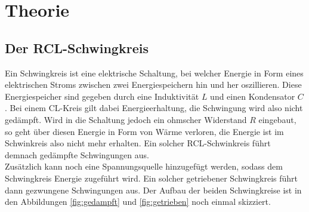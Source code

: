 \section{Theorie}
\label{sec:Theorie}
\subsection{Der RCL-Schwingkreis}
\label{sec:RCL}
Ein Schwingkreis ist eine elektrische Schaltung, bei welcher Energie in Form eines elektrischen Stroms zwischen zwei Energiespeichern hin 
und her oszillieren. Diese Energiespeicher sind gegeben durch eine Induktivität $L$ und einen Kondensator $C$. Bei einem CL-Kreis gilt dabei
Energieerhaltung, die Schwingung wird also nicht gedämpft. Wird in die Schaltung jedoch ein ohmscher Widerstand $R$ eingebaut, so geht über 
diesen Energie in Form von Wärme verloren, die Energie ist im Schwinkreis also nicht mehr erhalten. Ein solcher RCL-Schwinkreis führt demnach
gedämpfte Schwingungen aus.\\\noindent
Zusätzlich kann noch eine Spannungsquelle hinzugefügt werden, sodass dem Schwingkreis Energie zugeführt wird. Ein solcher getriebener 
Schwingkreis führt dann gezwungene Schwingungen aus. Der Aufbau der beiden Schwingkreise ist in den Abbildungen \ref{fig:gedampft} und 
\ref{fig:getrieben} noch einmal skizziert.
